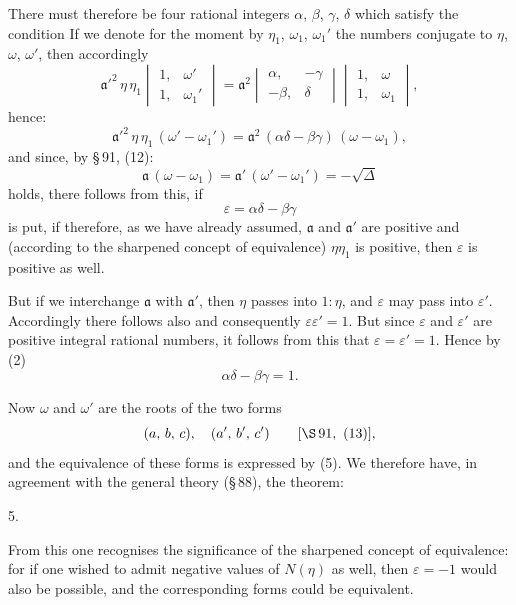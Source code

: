
 There must therefore be four rational integers
$\alpha$, $\beta$, $\gamma$, $\delta$ which satisfy the condition
If we denote for the moment by $\eta_1$, $\omega_1$, $\omega_1'$ the numbers
conjugate to $\eta$, $\omega$, $\omega'$, then accordingly
\[
\mathfrak{a}'^2\, \eta\, \eta_1
\begin{vmatrix} 1, & \omega' \\ 1, & \omega_1' \end{vmatrix}
= \mathfrak{a}^2
\begin{vmatrix} \alpha, & -\gamma \\ -\beta, & \delta \end{vmatrix}
\begin{vmatrix} 1, & \omega \\ 1, & \omega_1 \end{vmatrix},
\]
hence:
\[
\mathfrak{a}'^2\, \eta\, \eta_1\,(\omega' - \omega_1') = \mathfrak{a}^2\,(\alpha\delta - \beta\gamma)\,(\omega - \omega_1),
\]
and since, by \S\,91, (12):
\[
\mathfrak{a}\,(\omega - \omega_1) = \mathfrak{a}'\,(\omega' - \omega_1') = -\sqrt{\Delta}
\]
holds, there follows from this, if
\[
\varepsilon = \alpha\delta - \beta\gamma
\]
is put,
if therefore, as we have already assumed, $\mathfrak{a}$ and $\mathfrak{a}'$ are positive
and (according to the sharpened concept of equivalence) $\eta\eta_1$ is
positive, then $\varepsilon$ is positive as well.

But if we interchange $\mathfrak{a}$ with $\mathfrak{a}'$, then $\eta$ passes into $1 : \eta$, and
$\varepsilon$ may pass into $\varepsilon'$. Accordingly there follows also
and consequently $\varepsilon \varepsilon' = 1$. But since $\varepsilon$ and $\varepsilon'$ are positive integral
rational numbers, it follows from this that $\varepsilon = \varepsilon' = 1$. Hence by (2)
\[
\alpha\delta - \beta\gamma = 1.
\]

Now $\omega$ and $\omega'$ are the roots of the two forms
\[
(a,\, b,\, c), \quad (a',\, b',\, c') \qquad [\S\,91,\ (13)],
\]
and the equivalence of these forms is expressed by (5).
We therefore have, in agreement with the general theory
(\S\,88), the theorem:

5. 

From this one recognises the significance of the sharpened concept of
equivalence: for if one wished to admit negative values of
$N(\eta)$ as well, then $\varepsilon = -1$ would also be possible, and the
corresponding forms could be  equivalent.
